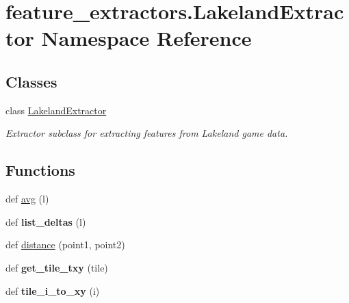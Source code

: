 \hypertarget{namespacefeature__extractors_1_1_lakeland_extractor}{}\section{feature\+\_\+extractors.\+Lakeland\+Extractor Namespace Reference}
\label{namespacefeature__extractors_1_1_lakeland_extractor}
\subsection*{Classes}
\begin{DoxyCompactItemize}
\item 
class \mbox{\hyperlink{classfeature__extractors_1_1_lakeland_extractor_1_1_lakeland_extractor}{Lakeland\+Extractor}}
\begin{DoxyCompactList}\small\item\em Extractor subclass for extracting features from Lakeland game data. \end{DoxyCompactList}\end{DoxyCompactItemize}
\subsection*{Functions}
\begin{DoxyCompactItemize}
\item 
def \mbox{\hyperlink{namespacefeature__extractors_1_1_lakeland_extractor_a8fddc453d0515d3be0e46dca69c77a8a}{avg}} (l)
\item 
\mbox{\label{namespacefeature__extractors_1_1_lakeland_extractor_afcecbe634f6fcc2c3115c716da2e1e2c}} 
def {\bfseries list\+\_\+deltas} (l)
\item 
def \mbox{\hyperlink{namespacefeature__extractors_1_1_lakeland_extractor_a4d630ffc0f862a66d972e5e4f2a10001}{distance}} (point1, point2)
\item 
\mbox{\label{namespacefeature__extractors_1_1_lakeland_extractor_a3502a7c87da85719b74f4d0f10d48719}} 
def {\bfseries get\+\_\+tile\+\_\+txy} (tile)
\item 
\mbox{\label{namespacefeature__extractors_1_1_lakeland_extractor_a9eb0b80e034a00a00067c4781382b6d4}} 
def {\bfseries tile\+\_\+i\+\_\+to\+\_\+xy} (i)
\end{DoxyCompactItemize}


